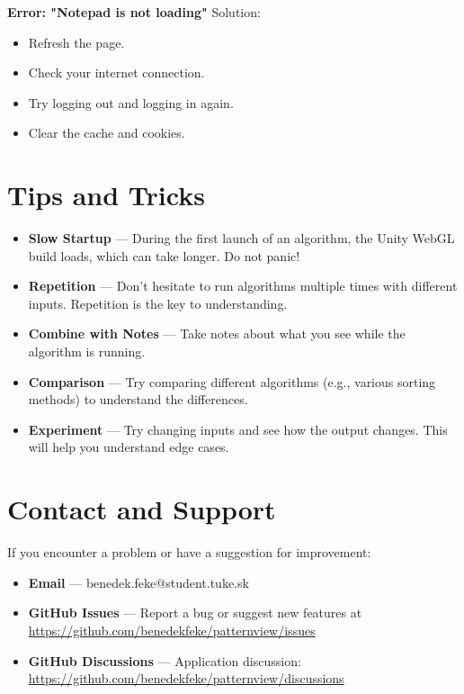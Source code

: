 \textbf{Error: "Notepad is not loading"}\newline
Solution:
\begin{itemize}
  \item Refresh the page.
  \item Check your internet connection.
  \item Try logging out and logging in again.
  \item Clear the cache and cookies.
\end{itemize}

\section{Tips and Tricks}

\begin{itemize}
  \item \textbf{Slow Startup} — During the first launch of an algorithm, the Unity WebGL build loads, which can take longer. Do not panic!
  \item \textbf{Repetition} — Don't hesitate to run algorithms multiple times with different inputs. Repetition is the key to understanding.
  \item \textbf{Combine with Notes} — Take notes about what you see while the algorithm is running.
  \item \textbf{Comparison} — Try comparing different algorithms (e.g., various sorting methods) to understand the differences.
  \item \textbf{Experiment} — Try changing inputs and see how the output changes. This will help you understand edge cases.
\end{itemize}

\section{Contact and Support}

If you encounter a problem or have a suggestion for improvement:
\begin{itemize}
  \item \textbf{Email} — benedek.feke@student.tuke.sk
  \item \textbf{GitHub Issues} — Report a bug or suggest new features at \url{https://github.com/benedekfeke/patternview/issues}
  \item \textbf{GitHub Discussions} — Application discussion: \url{https://github.com/benedekfeke/patternview/discussions}
\end{itemize}

